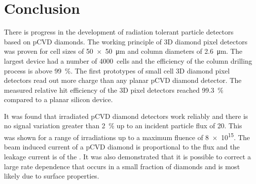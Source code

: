\section{Conclusion}
There is progress in the development of radiation tolerant particle detectors based on \ac{pCVD} diamonds. The working principle of 3D diamond pixel detectors was proven for cell sizes of \SI{50x50}{\micro\meter} and column diameters of \SI{2.6}{\micro\meter}. The largest device had a number of \SI{4000}{cells} and the efficiency of the column drilling process is above \SI{99}{\%}. The first prototypes of small cell 3D diamond pixel detectors read out more charge than any planar \ac{pCVD} diamond detector. The measured relative hit efficiency of the 3D pixel detectors reached \SI{99.3}{\%} compared to a planar silicon device.\par
It was found that irradiated \ac{pCVD} diamond detectors work reliably and there is no signal variation greater than \SI{2}{\%} up to an incident particle flux of \SI{20}{\mhzcm}. This was shown for a range of irradiations up to a maximum fluence of \SI{8e15}{\ncm}. The beam induced current of a \ac{pCVD} diamond is proportional to the flux and the leakage current is of the . It was also demonstrated that it is possible to correct a large rate dependence that occurs in a small fraction of diamonds and is most likely due to surface properties.
